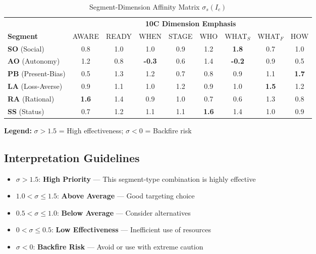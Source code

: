 \begin{table}[htbp]
\centering
\caption{Segment-Dimension Affinity Matrix $\sigma_s(I_c)$\footnotemark}
\label{tab:qq-matrix}
\renewcommand{\arraystretch}{1.4}
\small
\begin{tabular}{@{}l|cccccccc@{}}
\toprule
& \multicolumn{8}{c}{\textbf{10C Dimension Emphasis}} \\
\cmidrule{2-9}
\textbf{Segment} & AWARE & READY & WHEN & STAGE & WHO & WHAT$_S$ & WHAT$_F$ & HOW \\
\midrule
\textbf{SO} (Social) & 0.8 & 1.0 & 1.0 & 0.9 & 1.2 & \cellcolor{green!20}\textbf{1.8} & 0.7 & 1.0 \\
\textbf{AO} (Autonomy) & 1.2 & 0.8 & \cellcolor{red!20}\textbf{-0.3} & 0.6 & 1.4 & \cellcolor{red!20}\textbf{-0.2} & 0.9 & 0.5 \\
\textbf{PB} (Present-Bias) & 0.5 & 1.3 & 1.2 & 0.7 & 0.8 & 0.9 & 1.1 & \cellcolor{green!20}\textbf{1.7} \\
\textbf{LA} (Loss-Averse) & 0.9 & 1.1 & 1.0 & 1.2 & 0.9 & 1.0 & \cellcolor{green!20}\textbf{1.5} & 1.2 \\
\textbf{RA} (Rational) & \cellcolor{green!20}\textbf{1.6} & 1.4 & 0.9 & 1.0 & 0.7 & 0.6 & 1.3 & 0.8 \\
\textbf{SS} (Status) & 0.7 & 1.2 & 1.1 & 1.1 & \cellcolor{green!20}\textbf{1.6} & 1.4 & 1.0 & 0.9 \\
\bottomrule
\end{tabular}

\vspace{0.5em}
\footnotesize
\textbf{Legend:} \colorbox{green!20}{$\sigma > 1.5$} = High effectiveness;
\colorbox{red!20}{$\sigma < 0$} = Backfire risk
\end{table}

\subsection{Interpretation Guidelines}

\begin{itemize}
\item $\sigma > 1.5$: \textbf{High Priority} --- This segment-type combination is highly effective
\item $1.0 < \sigma \leq 1.5$: \textbf{Above Average} --- Good targeting choice
\item $0.5 < \sigma \leq 1.0$: \textbf{Below Average} --- Consider alternatives
\item $0 < \sigma \leq 0.5$: \textbf{Low Effectiveness} --- Inefficient use of resources
\item $\sigma < 0$: \textbf{Backfire Risk} --- Avoid or use with extreme caution
\end{itemize}

